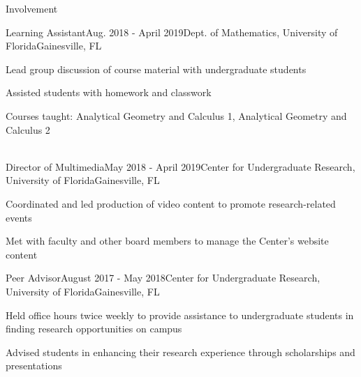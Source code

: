 \documentclass{resume}
\begin{document}
\begin{rSection}{Involvement}
  
\begin{rSubsection}{Learning Assistant}{Aug. 2018 - April 2019}{Dept. of Mathematics, University of Florida}{Gainesville, FL}
      \item Lead group discussion of course material with undergraduate students
      \item Assisted students with homework and classwork
      \item Courses taught: Analytical Geometry and Calculus 1, Analytical Geometry and Calculus 2 \\ \\ 
  \end{rSubsection}

 \begin{rSubsection}{Director of Multimedia}{May 2018 - April 2019}{Center for Undergraduate Research, University of Florida}{Gainesville, FL}
    \item Coordinated and led production of video content to promote research-related events
    \item Met with faculty and other board members to manage the Center's website content
\end{rSubsection}


\begin{rSubsection}{Peer Advisor}{August 2017 - May 2018}{Center for Undergraduate Research, University of Florida}{Gainesville, FL}
    \item Held office hours twice weekly to provide assistance to undergraduate students in finding research opportunities on campus
    \item Advised students in enhancing their research experience through scholarships and presentations
  \end{rSubsection}

\end{rSection}
  
\end{document}
